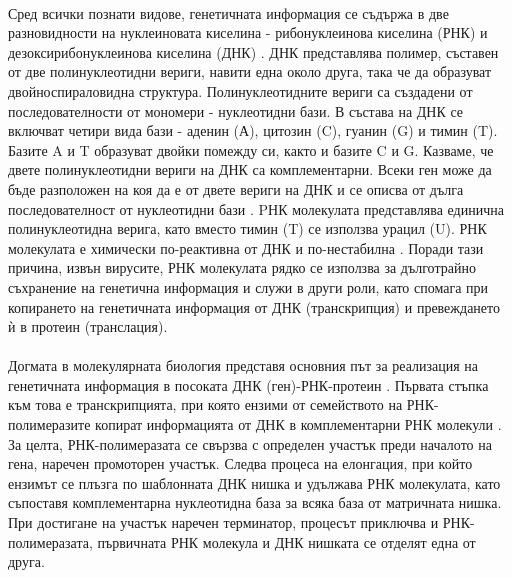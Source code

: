 \documentclass[pdftex,cyrillic,14pt,a4page,twoside,openright]{extreport}
\begin{document}
\paragraph{}
Сред всички познати видове, генетичната информация се съдържа в две разновидности на нуклеиновата киселина - рибонуклеинова киселина (РНК) и дезоксирибонуклеинова киселина (ДНК) \cite{houlihan2017}. ДНК представлява полимер, съставен от две полинуклеотидни вериги, навити една около друга, така че да образуват двойноспираловидна структура. Полинуклеотидните вериги са създадени от последователности от мономери - нуклеотидни бази. В състава на ДНК се включват четири вида бази - аденин (А), цитозин (C), гуанин (G) и тимин (T). Базите A и T образуват двойки помежду си, както и базите C и G. Казваме, че двете полинуклеотидни вериги на ДНК са комплементарни. Всеки ген може да бъде разположен на коя да е от двете вериги на ДНК и се описва от дълга последователност от нуклеотидни бази \cite[стр. 301-310]{klug2014}. PНК молекулата представлява единична полинуклеотидна верига, като вместо тимин (T) се използва урацил (U). РНК молекулата е химически по-реактивна от ДНК и по-нестабилна \cite{soukup1999, cristescu2019}. Поради тази причина, извън вирусите, РНК молекулата рядко се използва за дълготрайно съхранение на генетична информация и служи в други роли, като спомага при копирането на генетичната информация от ДНК (транскрипция) и превеждането ѝ в протеин (транслация).

\paragraph{}
Догмата в молекулярната биология представя основния път за реализация на генетичната информация в посоката ДНК (ген)-РНК-протеин \cite{crick1970central}. Първата стъпка към това е транскрипцията, при която ензими от семейството на РНК-полимеразите копират информацията от ДНК в комплементарни РНК молекули \cite{sims2004}. За целта, РНК-полимеразата се свързва с определен участък преди началото на гена, наречен промоторен участък. Следва процеса на елонгация, при който ензимът се плъзга по шаблонната ДНК нишка и удължава РНК молекулата, като съпоставя комплементарна нуклеотидна база за всяка база от матричната нишка. При достигане на участък наречен терминатор, процесът приключва и РНК-полимеразата, първичната РНК молекула и ДНК нишката се отделят една от друга.
\end{document}
